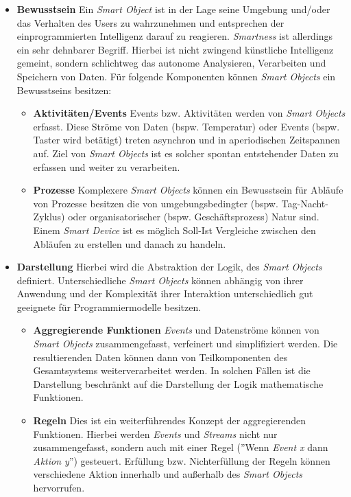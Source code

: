 \begin{itemize}
    \item \textbf{Bewusstsein} Ein \textit{Smart Object} ist in der Lage seine Umgebung und/oder das Verhalten des Users zu wahrzunehmen und entsprechen der einprogrammierten Intelligenz darauf zu reagieren. \textit{Smartness} ist allerdings ein sehr dehnbarer Begriff. Hierbei ist nicht zwingend künstliche Intelligenz gemeint, sondern schlichtweg das autonome Analysieren, Verarbeiten und Speichern von Daten. Für folgende Komponenten können \textit{Smart Objects} ein Bewusstseins besitzen:
    \begin{itemize}
        \item \textbf{Aktivitäten/Events} Events bzw. Aktivitäten werden von \textit{Smart Objects} erfasst. Diese Ströme von Daten (bspw. Temperatur) oder Events (bspw. Taster wird betätigt) treten asynchron und in aperiodischen Zeitspannen auf. Ziel von \textit{Smart Objects} ist es solcher spontan entstehender Daten zu erfassen und weiter zu verarbeiten.
        \item \textbf{Prozesse} Komplexere \textit{Smart Objects} können ein Bewusstsein für Abläufe von Prozesse besitzen die von umgebungsbedingter (bspw. Tag-Nacht-Zyklus) oder organisatorischer (bspw. Geschäftsprozess) Natur sind. Einem \textit{Smart Device} ist es möglich Soll-Ist Vergleiche zwischen den Abläufen zu erstellen und danach zu handeln.
    \end{itemize}
    \item \textbf{Darstellung} Hierbei wird die Abstraktion der Logik, des \textit{Smart Objects} definiert. Unterschiedliche \textit{Smart Objects} können abhängig von ihrer Anwendung und der Komplexität ihrer Interaktion unterschiedlich gut geeignete für Programmiermodelle besitzen.
    \begin{itemize}
        \item \textbf{Aggregierende Funktionen} \textit{Events} und Datenströme können von \textit{Smart Objects} zusammengefasst, verfeinert und simplifiziert werden. Die resultierenden Daten können dann von Teilkomponenten des Gesamtsystems weiterverarbeitet werden. In solchen Fällen ist die Darstellung beschränkt auf die Darstellung der Logik mathematische Funktionen.
        \item \textbf{Regeln} Dies ist ein weiterführendes Konzept der aggregierenden Funktionen. Hierbei werden \textit{Events} und \textit{Streams} nicht nur zusammengefasst, sondern auch mit einer Regel (''Wenn \textit{Event x} dann \textit{Aktion y}'') gesteuert. Erfüllung bzw. Nichterfüllung der Regeln können verschiedene Aktion innerhalb und außerhalb des \textit{Smart Objects} hervorrufen.

\end{itemize}
\end{itemize}
